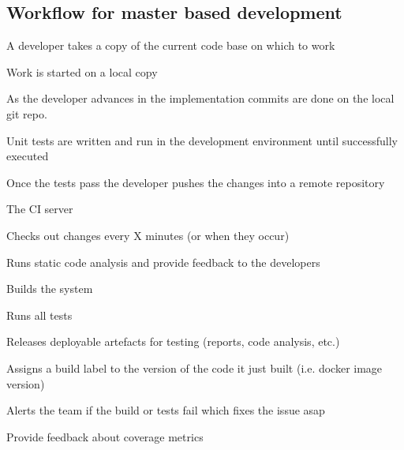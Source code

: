 \documentclass[a4paper,
               keeplastbox,   %
               ]{jacow}
\begin{document}
\subsection{Workflow for master based development}
\begin{Itemize}
    \item A developer takes a copy of the current code base on which to work
    \item Work is started on a local copy
    \item As the developer advances in the implementation commits are done on the local git repo. 
    \item Unit tests are written and run in the development environment until successfully executed
    \item Once the tests pass the developer pushes the changes into a remote repository 
    \item The CI server 
\begin{Itemize}
    \item Checks out changes every X minutes (or when they occur)
    \item Runs static code analysis and provide feedback to the developers
    \item Builds the system 
    \item Runs all tests
    \item Releases deployable artefacts for testing (reports, code analysis, etc.)
    \item Assigns a build label to the version of the code it just built (i.e. docker image version)
    \item Alerts the team if the build or tests fail which fixes the issue asap
    \item Provide feedback about coverage metrics
\end{Itemize}
\end{Itemize}
\end{document}
